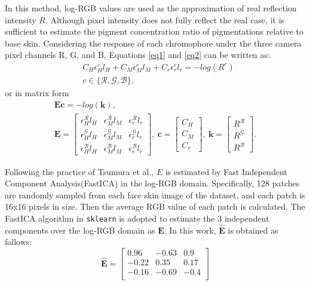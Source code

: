 \begin{spacing}{1.5}
In this method, log-RGB values are used as the approximation of real reflection intensity $R$. Although pixel intensity does not fully reflect the real case, it is sufficient to estimate the pigment concentration ratio of pigmentations relative to base skin. Considering the response of each chromophore under the three camera pixel channels R, G, and B, Equations \ref{eq1} and \ref{eq2} can be written as:
\begin{equation}
    \begin{aligned}
         & C_H\epsilon_H^c l_H + C_M\epsilon_M^c l_M + C_r\epsilon_r^c l_r = -log(R^c) \\
         & c\in\{\mathcal{R},\mathcal{G},\mathcal{B}\},
    \end{aligned}
\end{equation}
or in matrix form
\begin{gather*}
    \mathbf{E}\mathbf{c}=-log(\mathbf{k}),\\
    \mathbf{E}=\begin{bmatrix}
        \epsilon_H^\mathcal{R} l_H & \epsilon_M^\mathcal{R} l_M & \epsilon_r^\mathcal{R} l_r \\
        \epsilon_H^\mathcal{G} l_H & \epsilon_M^\mathcal{G} l_M & \epsilon_r^\mathcal{G} l_r \\
        \epsilon_H^\mathcal{B} l_H & \epsilon_M^\mathcal{B} l_M & \epsilon_r^\mathcal{B} l_r
    \end{bmatrix},\
    \mathbf{c}=\begin{bmatrix}C_H \\C_M \\C_r\end{bmatrix},\
    \mathbf{k}=\begin{bmatrix}R^\mathcal{R} \\R^\mathcal{G} \\R^\mathcal{B}\end{bmatrix}.
\end{gather*}

Following the practice of Tsumura et al.\cite{tsumura1999independent}, $E$ is estimated by Fast Independent Component Analysis(FastICA)\cite{HYVARINEN2000411} in the log-RGB domain. Specifically, 128 patches are randomly sampled from each face skin image of the dataset, and each patch is 16x16 pixels in size. Then the average RGB value of each patch is calculated. The FastICA algorithm in \texttt{sklearn}\cite{scikit-learn} is adopted to estimate the 3 independent components over the log-RGB domain as $\mathbf{E}$. In this work, $\hat{\mathbf{E}}$ is obtained as follows:
\begin{equation}
    \hat{\mathbf{E}} = \begin{bmatrix}
        0.96  & -0.63 & 0.9  \\
        -0.22 & 0.35  & 0.17 \\
        -0.16 & -0.69 & -0.4 \\
    \end{bmatrix}
\end{equation}


\end{spacing}
